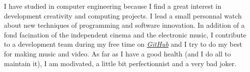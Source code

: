 I have studied in computer engineering because I find a great interest in development creativity and computing projects. I lead a small personnal watch about new techniques of programming and software innovation.
In addition of a fond facination of the independent cinema and the electronic music, I contribute to a development team during my free time on \href{https://github.com/team-chiru}{\textit{GitHub}} and I try to do my best for making music and video.
As far as I have a good health (and I do all to maintain it), I am modivated, a little bit perfectionnist and a very bad joker.
\vspace{.25em}
